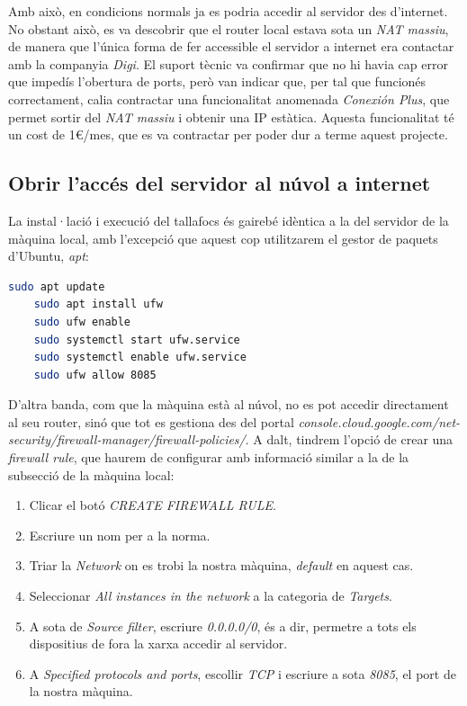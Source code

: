 Amb això, en condicions normals ja es podria accedir al servidor des d'internet. No obstant això, es va descobrir que el router local estava sota un \textit{NAT massiu}, de manera que l'única forma de fer accessible el servidor a internet era contactar amb la companyia \textit{Digi}. El suport tècnic va confirmar que no hi havia cap error que impedís l'obertura de ports, però van indicar que, per tal que funcionés correctament, calia contractar una funcionalitat anomenada \textit{Conexión Plus}, que permet sortir del \textit{NAT massiu} i obtenir una IP estàtica. Aquesta funcionalitat té un cost de 1€/mes, que es va contractar per poder dur a terme aquest projecte.

\subsection{Obrir l'accés del servidor al núvol a internet}

La instal·lació i execució del tallafocs és gairebé idèntica a la del servidor de la màquina local, amb l'excepció que aquest cop utilitzarem el gestor de paquets d'Ubuntu, \textit{apt}:

\begin{lstlisting}[language=bash, caption=Instalació del tallafocs al servidor del núvol]
    sudo apt update
    sudo apt install ufw
    sudo ufw enable
    sudo systemctl start ufw.service
    sudo systemctl enable ufw.service
    sudo ufw allow 8085
\end{lstlisting}

\label{subsec:PortForwardingCloud}
D'altra banda, com que la màquina està al núvol, no es pot accedir directament al seu router, sinó que tot es gestiona des del portal \textit{console.cloud.google.com/net-security/firewall-manager/firewall-policies/}. A dalt, tindrem l'opció de crear una \textit{firewall rule}, que haurem de configurar amb informació similar a la de la subsecció de la màquina local:

\begin{enumerate} \item Clicar el botó \textit{CREATE FIREWALL RULE}. \item Escriure un nom per a la norma. \item Triar la \textit{Network} on es trobi la nostra màquina, \textit{default} en aquest cas. \item Seleccionar \textit{All instances in the network} a la categoria de \textit{Targets}. \item A sota de \textit{Source filter}, escriure \textit{0.0.0.0/0}, és a dir, permetre a tots els dispositius de fora la xarxa accedir al servidor. \item A \textit{Specified protocols and ports}, escollir \textit{TCP} i escriure a sota \textit{8085}, el port de la nostra màquina. \end{enumerate}

